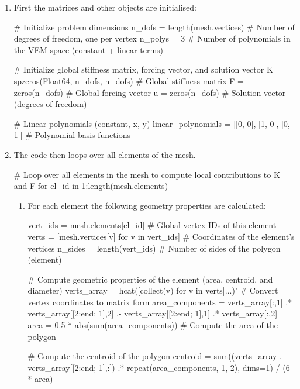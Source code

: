 \documentclass{report}
\begin{document}
\begin{enumerate}
    \item First the matrices and other objects are initialised:
    \begin{jllisting}[style=JuliaStyle]
    # Initialize problem dimensions
    n_dofs = length(mesh.vertices)  # Number of degrees of freedom, one per vertex
    n_polys = 3  # Number of polynomials in the VEM space (constant + linear terms)
    
    # Initialize global stiffness matrix, forcing vector, and solution vector
    K = spzeros(Float64, n_dofs, n_dofs)  # Global stiffness matrix
    F = zeros(n_dofs)  # Global forcing vector
    u = zeros(n_dofs)  # Solution vector (degrees of freedom)
    
    # Linear polynomials (constant, x, y)
    linear_polynomials = [[0, 0], [1, 0], [0, 1]]  # Polynomial basis functions
    \end{jllisting}
    
    \item The code then loops over all elements of the mesh.
    \begin{jllisting}[style=JuliaStyle]
        # Loop over all elements in the mesh to compute local contributions to K and F
        for el_id in 1:length(mesh.elements)
    \end{jllisting}

    \begin{enumerate}
        \item For each element the following geometry properties are calculated:
        \begin{jllisting}[style=JuliaStyle]
            vert_ids = mesh.elements[el_id]  # Global vertex IDs of this element
            verts = [mesh.vertices[v] for v in vert_ids]  # Coordinates of the element's vertices
            n_sides = length(vert_ids)  # Number of sides of the polygon (element)
        
            # Compute geometric properties of the element (area, centroid, and diameter)
            verts_array = hcat([collect(v) for v in verts]...)'  # Convert vertex coordinates to matrix form
            area_components = verts_array[:,1] .* verts_array[[2:end; 1],2] .- verts_array[[2:end; 1],1] .* verts_array[:,2]
            area = 0.5 * abs(sum(area_components))  # Compute the area of the polygon
        
            # Compute the centroid of the polygon
            centroid = sum((verts_array .+ verts_array[[2:end; 1],:]) .* repeat(area_components, 1, 2), dims=1) / (6 * area)
        

\end{jllisting}
\end{enumerate}
\end{enumerate}
\end{document}
